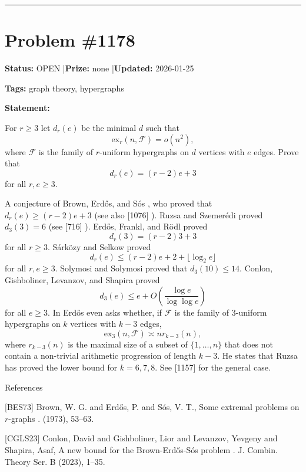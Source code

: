 \documentclass{article}
\begin{document}
\noindent\rule{\linewidth}{0.4pt}


\section{Problem \#1178}
\label{prob:1178}

\noindent\textbf{Status:} OPEN \quad|\quad \textbf{Prize:} none \quad|\quad \textbf{Updated:} 2026-01-25

\noindent\textbf{Tags:} graph theory, hypergraphs

\medskip

\noindent\textbf{Statement:}

For $r\geq 3$ let $d_r(e)$ be the minimal $d$ such that\[\mathrm{ex}_r(n,\mathcal{F})=o(n^2),\]where $\mathcal{F}$ is the family of $r$-uniform hypergraphs on $d$ vertices with $e$ edges. Prove that\[d_r(e)=(r-2)e+3\]for all $r,e\geq 3$.




A conjecture of Brown, Erd\H{o}s, and S\'{o}s \cite{BES73}, who proved that $d_r(e)\geq (r-2)e+3$ (see also [1076] ). Ruzsa and Szemer\'{e}di \cite{RuSz78} proved $d_3(3)=6$ (see [716] ). Erd\H{o}s, Frankl, and R\"{o}dl \cite{EFR86} proved\[d_r(3)= (r-2)3+3\]for all $r\geq 3$. S\'{a}rk\"{o}zy and Selkow \cite{SaSe05} proved\[d_r(e) \leq (r-2)e+2+\lfloor \log_2 e\rfloor\]for all $r,e\geq 3$. Solymosi and Solymosi \cite{SoSo17} proved that $d_3(10)\leq 14$. Conlon, Gishboliner, Levanzov, and Shapira \cite{CGLS23} proved\[d_3(e)\leq e+O\left(\frac{\log e}{\log\log e}\right)\]for all $e\geq 3$. In \cite{Er75b} Erd\H{o}s even asks whether, if $\mathcal{F}$ is the family of $3$-uniform hypergraphs on $k$ vertices with $k-3$ edges,\[\mathrm{ex}_3(n,\mathcal{F})\asymp n r_{k-3}(n),\]where $r_{k-3}(n)$ is the maximal size of a subset of $\{1,\ldots,n\}$ that does not contain a non-trivial arithmetic progression of length $k-3$. He states that Ruzsa has proved the lower bound for $k=6,7,8$. See [1157] for the general case.




References

[BES73] Brown, W. G. and Erd\H{o}s, P. and S\'os, V. T., Some extremal problems on {$r$}-graphs . (1973), 53--63.

[CGLS23] Conlon, David and Gishboliner, Lior and Levanzov, Yevgeny and Shapira, Asaf, A new bound for the {B}rown-{E}rd\H os-S\'os problem . J. Combin. Theory Ser. B (2023), 1--35.
\end{document}

